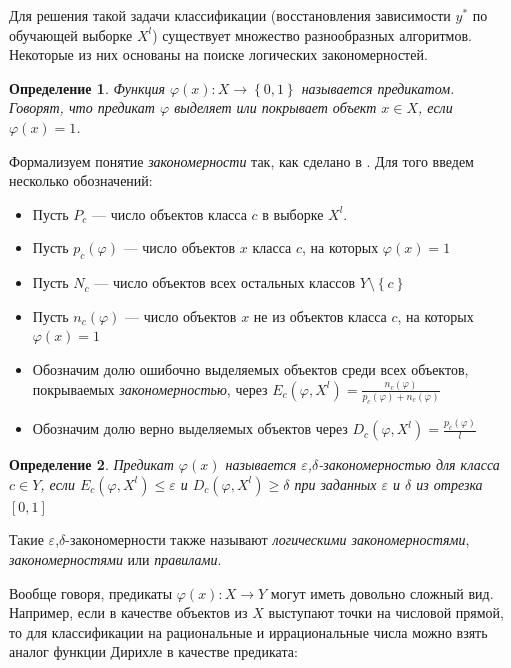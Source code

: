 \documentclass[12pt]{article}
\newtheorem{definition}{Определение}
\begin{document}
Для решения такой задачи классификации (восстановления зависимости
\(y^{*}\) по обучающей выборке \(X^l\)) существует множество
разнообразных алгоритмов. Некоторые из них основаны на поиске
логических закономерностей.

\begin{definition}
  Функция \(\varphi(x) \colon X \rightarrow \left\{0, 1\right\}\)
  называется \emph{предикатом}. Говорят, что предикат
  \(\varphi\) \emph{выделяет} или \emph{покрывает} объект \(x \in X\),
  если \(\varphi(x) = 1\).
\end{definition}

Формализуем понятие \emph{закономерности} так, как сделано в
\cite{voron10logicalgs}. Для того введем несколько обозначений:

\begin{itemize}
\item Пусть \(P_c\) --- число объектов класса \(c\) в выборке \(X^l\).
\item Пусть \(p_c(\varphi)\) --- число объектов \(x\) класса \(c\), на
  которых \(\varphi(x) = 1\)
\item Пусть \(N_c\) --- число объектов всех остальных классов \(Y
  \setminus \left\{c\right\}\)
\item Пусть \(n_c(\varphi)\) --- число объектов \(x\) не из объектов
  класса \(c\), на которых \(\varphi(x) = 1\)
\item Обозначим долю ошибочно выделяемых объектов среди всех объектов,
  покрываемых \emph{закономерностью}, через \(E_c(\varphi, X^l) =
  \frac{n_c(\varphi)}{p_c(\varphi) + n_c(\varphi)}\)
\item Обозначим долю верно выделяемых объектов через \(D_c(\varphi,
  X^l) = \frac{p_c(\varphi)}{l}\)
\end{itemize}

\begin{definition}
  Предикат \(\varphi(x)\) называется
  \emph{\(\varepsilon\),\(\delta\)-закономерностью} для класса \(c \in
  Y\), если \(E_c(\varphi, X^l) \leq \varepsilon \) и \(D_c(\varphi,
  X^l)\geq\delta\) при заданных \(\varepsilon\) и \(\delta\) из
  отрезка \([0, 1]\)
\end{definition}

Такие \(\varepsilon\),\(\delta\)-закономерности также называют
\emph{логическими закономерностями}, \emph{закономерностями} или
\emph{правилами}.

Вообще говоря, предикаты \(\varphi(x)\colon X \rightarrow Y\) могут
иметь довольно сложный вид. Например, если в качестве объектов из
\(X\) выступают точки на числовой прямой, то для классификации на
рациональные и иррациональные числа можно взять аналог функции Дирихле
в качестве предиката:
\end{document}
